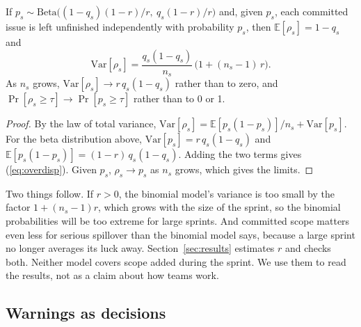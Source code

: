 \begin{proposition}
\label{prop:overdisp}
If $p_s \sim \mathrm{Beta}\big((1-q_s)(1-r)/r,\ q_s(1-r)/r\big)$ and, given $p_s$, each committed issue is left unfinished independently with probability $p_s$, then $\mathbb{E}[\rho_s] = 1 - q_s$ and
\begin{equation}
\mathrm{Var}[\rho_s] = \frac{q_s (1 - q_s)}{n_s}\,\big(1 + (n_s - 1)\, r\big).
\label{eq:overdisp}
\end{equation}
As $n_s$ grows, $\mathrm{Var}[\rho_s] \to r\, q_s (1 - q_s)$ rather than to zero, and $\Pr[\rho_s \ge \tau] \to \Pr[p_s \ge \tau]$ rather than to 0 or 1.
\end{proposition}

\begin{proof}
By the law of total variance, $\mathrm{Var}[\rho_s] = \mathbb{E}[p_s(1-p_s)]/n_s + \mathrm{Var}[p_s]$. For the beta distribution above, $\mathrm{Var}[p_s] = r\,q_s(1-q_s)$ and $\mathbb{E}[p_s(1-p_s)] = (1-r)\,q_s(1-q_s)$. Adding the two terms gives (\ref{eq:overdisp}). Given $p_s$, $\rho_s \to p_s$ as $n_s$ grows, which gives the limits.
\end{proof}

Two things follow. If $r > 0$, the binomial model's variance is too small by the factor $1 + (n_s - 1) r$, which grows with the size of the sprint, so the binomial probabilities will be too extreme for large sprints. And committed scope matters even less for serious spillover than the binomial model says, because a large sprint no longer averages its luck away. Section~\ref{sec:results} estimates $r$ and checks both. Neither model covers scope added during the sprint. We use them to read the results, not as a claim about how teams work.

\subsection{Warnings as decisions}

